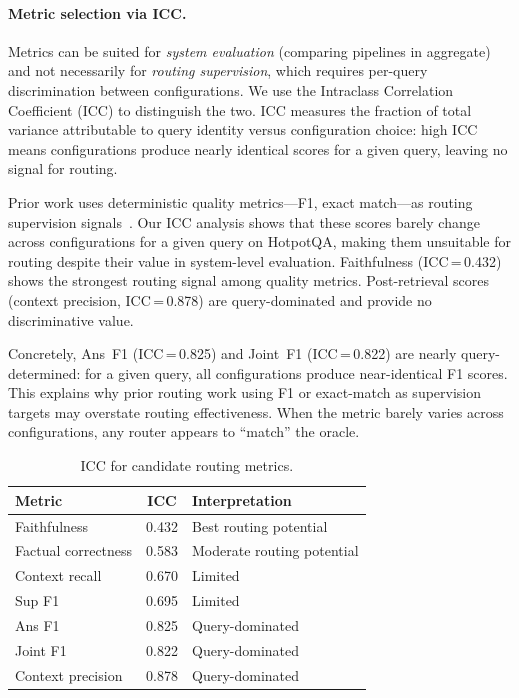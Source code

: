 
\paragraph{Metric selection via ICC.}
Metrics can be suited for \emph{system evaluation} (comparing pipelines in
aggregate) and not necessarily for \emph{routing supervision}, which
requires per-query discrimination between configurations. We use the
Intraclass Correlation Coefficient (ICC) to distinguish the two. ICC measures
the fraction of total variance attributable to query identity versus
configuration choice: high ICC means configurations produce nearly identical
scores for a given query, leaving no signal for routing.

Prior work uses deterministic quality metrics---F1, exact match---as
routing supervision signals~\cite{metis2025,adaptiverag2024,routellm2025}.
Our ICC analysis shows that these scores barely change across
configurations for a given query on HotpotQA, making them unsuitable for
routing despite their value in system-level evaluation. Faithfulness
(ICC\,=\,0.432) shows the strongest routing signal among quality metrics.
Post-retrieval scores (context precision, ICC\,=\,0.878) are
query-dominated and provide no discriminative value.

Concretely, Ans~F1 (ICC\,=\,0.825) and Joint~F1 (ICC\,=\,0.822) are
nearly query-determined: for a given query, all configurations produce
near-identical F1 scores. This explains why prior routing work using F1 or
exact-match as supervision targets may overstate routing effectiveness. When
the metric barely varies across configurations, any router appears to
``match'' the oracle.


\begin{table}[h!]
\centering
\begin{tabular}{l c l}
\hline
\textbf{Metric} & \textbf{ICC} & \textbf{Interpretation} \\
\hline
Faithfulness              & 0.432 & Best routing potential \\
Factual correctness       & 0.583 & Moderate routing potential \\
Context recall            & 0.670 & Limited \\
Sup F1                    & 0.695 & Limited \\
Ans F1                    & 0.825 & Query-dominated \\
Joint F1                  & 0.822 & Query-dominated \\
Context precision         & 0.878 & Query-dominated \\
\hline
\end{tabular}
\caption{ICC for candidate routing metrics.}
\label{tab:icc}
\end{table}

